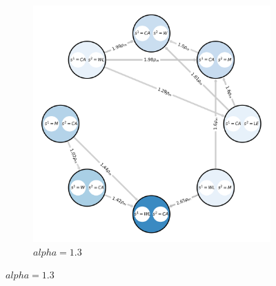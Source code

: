 \begin{flushleft}
\begin{flushleft}
\begin{figure}[H]
\begin{subfigure}[b]{0.39\linewidth}
                \includegraphics[width=\linewidth]{images/rg_1.3.png}
                \caption{$alpha=1.3$}
                \label{fig:response_graph_1.3}
            \end{subfigure}
        

\end{figure}
\end{flushleft}
\end{flushleft}
